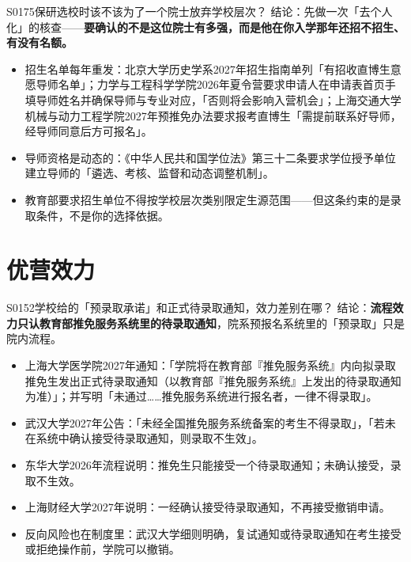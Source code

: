 \begin{qa}{S0175}{保研选校时该不该为了一个院士放弃学校层次？}
结论：先做一次「去个人化」的核查——\textbf{要确认的不是这位院士有多强，而是他在你入学那年还招不招生、有没有名额。}

\begin{itemize}
  \item 招生名单每年重发：北京大学历史学系2027年招生指南单列「有招收直博生意愿导师名单」；力学与工程科学学院2026年夏令营要求申请人在申请表首页手填导师姓名并确保导师与专业对应，「否则将会影响入营机会」；上海交通大学机械与动力工程学院2027年预推免办法要求报考直博生「需提前联系好导师，经导师同意后方可报名」。
  \item 导师资格是动态的：《中华人民共和国学位法》第三十二条要求学位授予单位建立导师的「遴选、考核、监督和动态调整机制」。
  \item 教育部要求招生单位不得按学校层次类别限定生源范围——但这条约束的是录取条件，不是你的选择依据。
\end{itemize}
\end{qa}

\section{优营效力}
\begin{qa}{S0152}{学校给的「预录取承诺」和正式待录取通知，效力差别在哪？}
结论：\textbf{流程效力只认教育部推免服务系统里的待录取通知}，院系预报名系统里的「预录取」只是院内流程。

\begin{itemize}
  \item 上海大学医学院2027年通知：「学院将在教育部『推免服务系统』内向拟录取推免生发出正式待录取通知（以教育部『推免服务系统』上发出的待录取通知为准）」；并写明「未通过……推免服务系统进行报名者，一律不得录取」。
  \item 武汉大学2027年公告：「未经全国推免服务系统备案的考生不得录取」，「若未在系统中确认接受待录取通知，则录取不生效」。
  \item 东华大学2026年流程说明：推免生只能接受一个待录取通知；未确认接受，录取不生效。
  \item 上海财经大学2027年说明：一经确认接受待录取通知，不再接受撤销申请。
  \item 反向风险也在制度里：武汉大学细则明确，复试通知或待录取通知在考生接受或拒绝操作前，学院可以撤销。
\end{itemize}
\end{qa}

